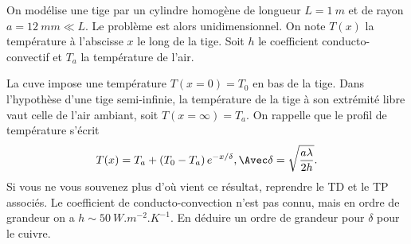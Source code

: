 On modélise une tige par un cylindre homogène de longueur $L=\SI{1}{m}$ et de rayon $a = \SI{12}{mm} \ll L$. Le problème est alors unidimensionnel. On note $T(x)$ la température à l’abscisse $x$ le long de la tige. Soit $h$ le coefficient conducto-convectif et $T_a$ la température de l’air.
\begin{protocole}


%
\todo
La cuve impose une température $T(x=0)=T_0$ en bas de la tige. Dans l'hypothèse d'une tige semi-infinie, la température de la tige à son extrémité libre vaut celle de l’air ambiant, soit $T(x=\infty)=T_a$. On rappelle que le profil de température s'écrit
\begin{equation}\label{eq:profil}
T(x) = T_a + (T_0-T_a)\,e^{-x/\delta}, \Avec \delta=\sqrt{\frac{a\lambda}{2h}}.
\end{equation}
Si vous ne vous souvenez plus d'où vient ce résultat, reprendre le TD et le TP associés. Le coefficient de conducto-convection n'est pas connu, mais en ordre de grandeur on a $h \sim
 \SI{50}{W.m^{-2}.K^{-1}}$. En déduire un ordre de grandeur pour $\delta$ pour le cuivre.


\end{protocole}

